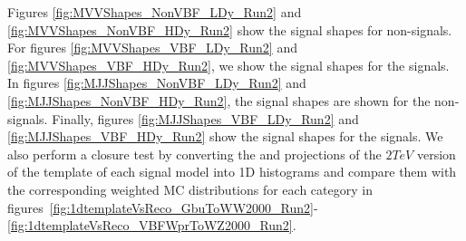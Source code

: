 Figures \ref{fig:MVVShapes_NonVBF_LDy_Run2} and \ref{fig:MVVShapes_NonVBF_HDy_Run2} show the \MVV signal shapes for non-\VBF signals.
For figures \ref{fig:MVVShapes_VBF_LDy_Run2} and \ref{fig:MVVShapes_VBF_HDy_Run2}, we show the \MVV signal shapes for the \VBF signals.
In figures \ref{fig:MJJShapes_NonVBF_LDy_Run2} and \ref{fig:MJJShapes_NonVBF_HDy_Run2}, the \MJ signal shapes are shown for the non-\VBF signals.
Finally, figures \ref{fig:MJJShapes_VBF_LDy_Run2} and \ref{fig:MJJShapes_VBF_HDy_Run2} show the \MJ signal shapes for the \VBF signals.
We also perform a closure test by converting the \MVV and \MJ projections of the $2\unit{TeV}$ version of the template of each signal model into 1D histograms and compare them with the corresponding weighted MC distributions for each category in figures~\ref{fig:1dtemplateVsReco_GbuToWW2000_Run2}-\ref{fig:1dtemplateVsReco_VBFWprToWZ2000_Run2}.

